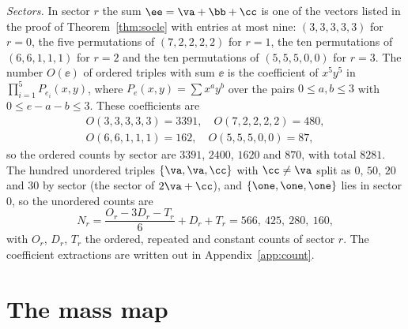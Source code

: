 \emph{Sectors.} In sector $r$ the sum $\ee=\va+\bb+\cc$ is one of the
vectors listed in the proof of Theorem~\ref{thm:socle} with entries at most
nine: $(3,3,3,3,3)$ for $r=0$, the five permutations of $(7,2,2,2,2)$ for
$r=1$, the ten permutations of $(6,6,1,1,1)$ for $r=2$ and the ten
permutations of $(5,5,5,0,0)$ for $r=3$. The number $O(\ee)$ of ordered
triples with sum $\ee$ is the coefficient of $x^5y^5$ in
$\prod_{i=1}^5P_{e_i}(x,y)$, where $P_e(x,y)=\sum x^ay^b$ over the pairs
$0\le a,b\le3$ with $0\le e-a-b\le3$. These coefficients are
\begin{gather*}
O(3,3,3,3,3)=3391,\quad O(7,2,2,2,2)=480,\\
O(6,6,1,1,1)=162,\quad O(5,5,5,0,0)=87,
\end{gather*}
so the ordered counts by sector are $3391$, $2400$, $1620$ and $870$, with
total $8281$. The hundred unordered triples $\{\va,\va,\cc\}$ with
$\cc\ne\va$ split as $0$, $50$, $20$ and $30$ by sector (the sector of
$2\va+\cc$), and $\{\one,\one,\one\}$ lies in sector $0$, so the unordered
counts are
\[
N_r=\frac{O_r-3D_r-T_r}{6}+D_r+T_r=566,\ 425,\ 280,\ 160,
\]
with $O_r$, $D_r$, $T_r$ the ordered, repeated and constant counts of
sector $r$. The coefficient extractions are written out in
Appendix~\ref{app:count}.

\section{The mass map}\label{sec:mass}

